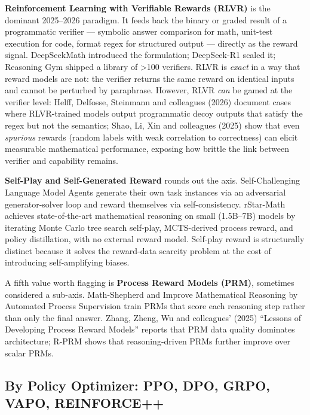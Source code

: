 \documentclass{article}
\begin{document}
\textbf{Reinforcement Learning with Verifiable Rewards (RLVR)} is the dominant 2025--2026 paradigm. It feeds back the binary or graded result of a programmatic verifier --- symbolic answer comparison for math, unit-test execution for code, format regex for structured output --- directly as the reward signal. DeepSeekMath \citep{shao20242024} introduced the formulation; DeepSeek-R1 \citep{guo20252025} scaled it; Reasoning Gym \citep{stojanovski20252025} shipped a library of \textgreater100 verifiers. RLVR is \emph{exact} in a way that reward models are not: the verifier returns the same reward on identical inputs and cannot be perturbed by paraphrase. However, RLVR \emph{can} be gamed at the verifier level: Helff, Delfosse, Steinmann and colleagues (2026) document cases where RLVR-trained models output programmatic decoy outputs that satisfy the regex but not the semantics; Shao, Li, Xin and colleagues (2025) show that even \emph{spurious} rewards (random labels with weak correlation to correctness) can elicit measurable mathematical performance, exposing how brittle the link between verifier and capability remains.

\textbf{Self-Play and Self-Generated Reward} rounds out the axis. Self-Challenging Language Model Agents \citep{zhou20252025} generate their own task instances via an adversarial generator-solver loop and reward themselves via self-consistency. rStar-Math \citep{guan20252025} achieves state-of-the-art mathematical reasoning on small (1.5B--7B) models by iterating Monte Carlo tree search self-play, MCTS-derived process reward, and policy distillation, with no external reward model. Self-play reward is structurally distinct because it solves the reward-data scarcity problem at the cost of introducing self-amplifying biases.

A fifth value worth flagging is \textbf{Process Reward Models (PRM)}, sometimes considered a sub-axis. Math-Shepherd \citep{wang20242024} and Improve Mathematical Reasoning by Automated Process Supervision \citep{luo20242024} train PRMs that score each reasoning step rather than only the final answer. Zhang, Zheng, Wu and colleagues' (2025) ``Lessons of Developing Process Reward Models'' reports that PRM data quality dominates architecture; R-PRM \citep{she20252025} shows that reasoning-driven PRMs further improve over scalar PRMs.

\subsection{By Policy Optimizer: PPO, DPO, GRPO, VAPO, REINFORCE++}\label{by-policy-optimizer-ppo-dpo-grpo-vapo-reinforce}
\end{document}
